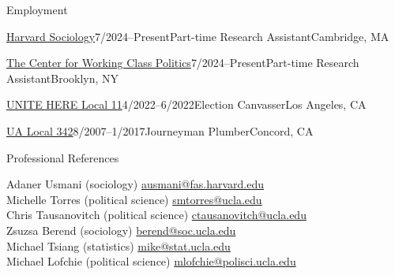 \documentclass[
	11pt, %
]{resume} %
\begin{document}
\begin{samepage}
\begin{rSection}{Employment}

	\begin{rSubsection}{\href{https://sociology.fas.harvard.edu/}{Harvard Sociology}}{7/2024--Present}{Part-time Research Assistant}{Cambridge, MA}
	\end{rSubsection}
	
	\begin{rSubsection}{\href{https://www.workingclasspolitics.org/}{The Center for Working Class Politics}}{7/2024--Present}{Part-time Research Assistant}{Brooklyn, NY}
	\end{rSubsection}
	
	\begin{rSubsection}{\href{https://www.unitehere11.org/}{UNITE HERE Local 11}}{4/2022--6/2022}{Election Canvasser}{Los Angeles, CA}
	\end{rSubsection}

	\begin{rSubsection}{\href{https://ua342.org/}{UA Local 342}}{8/2007--1/2017}{Journeyman Plumber}{Concord, CA}
	\end{rSubsection}

\end{rSection}
\end{samepage}


\begin{rSection}{Professional References}

Adaner Usmani (sociology) \hfill \href{mailto:ausmani@fas.harvard.edu}{ausmani@fas.harvard.edu}\\
Michelle Torres (political science) \hfill \href{mailto:smtorres@ucla.edu}{smtorres@ucla.edu}\\
Chris Tausanovitch (political science) \hfill \href{mailto:ctausanovitch@ucla.edu}{ctausanovitch@ucla.edu}\\
Zsuzsa Berend (sociology) \hfill \href{mailto:berend@soc.ucla.edu}{berend@soc.ucla.edu}\\
Michael Tsiang (statistics) \hfill \href{mailto:mike@stat.ucla.edu}{mike@stat.ucla.edu}\\
Michael Lofchie (political science) \hfill \href{mailto:mlofchie@polisci.ucla.edu}{mlofchie@polisci.ucla.edu}
\end{rSection}

\end{document}
